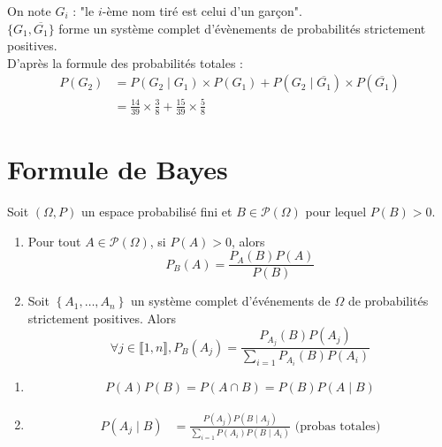 \documentclass[../main.tex]{subfiles}
\begin{document}
\noindent On note $G_i$ : "le $i$-ème nom tiré est celui d'un garçon". \\
$\{ G_1, \overline{G_1} \}$ forme un système complet d'évènements de probabilités strictement positives. \\
D'après la formule des probabilités totales : 
\begin{align*}
    P(G_2) &= P(G_2 \mid G_1) \times P(G_1) + P(G_2 \mid \overline{G_1}) \times P(\overline{G_1}) \\
    &= \frac{14}{39} \times \frac{3}{8} + \frac{15}{39} \times \frac{5}{8}
\end{align*}

\section{Formule de Bayes}
\begin{tcolorbox}[title=Théorème 32.33, title filled=false, colframe=orange, colback=orange!10!white]
    Soit $(\Omega, P)$ un espace probabilisé fini et $B \in \mathcal{P}(\Omega)$ pour lequel $P(B)>0$.
    \begin{enumerate}
        \item Pour tout $A \in \mathcal{P}(\Omega)$, si $P(A)>0$, alors
        $$P_B(A)=\frac{P_A(B) P(A)}{P(B)}$$
        \item Soit $\left\{A_1, \ldots, A_n\right\}$ un système complet d'événements de $\Omega$ de probabilités strictement positives. Alors
        $$\forall j \in \llbracket 1, n \rrbracket, P_B\left(A_j\right)=\frac{P_{A_j}(B) P\left(A_j\right)}{\sum\limits_{i=1} P_{A_i}(B) P\left(A_i\right)}$$
    \end{enumerate}
\end{tcolorbox}

\begin{enumerate}
    \item \begin{align*}
        P(A)P(B) = P(A\cap B) = P(B) P(A \mid B)
    \end{align*}
    \item \begin{align*}
        P(A_j \mid B) &= \frac{P(A_j)P(B\mid A_j)}{\sum\limits_{i=1} P(A_i)P(B\mid A_i)} \text{ (probas totales)}
    \end{align*}
\end{enumerate}

\end{document}
